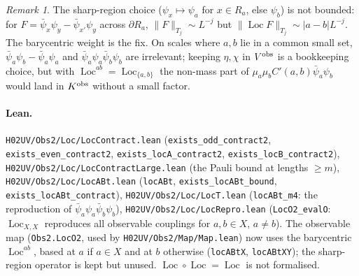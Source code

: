 \documentclass[11pt]{amsart}
\theoremstyle{definition}
\theoremstyle{remark}
\newtheorem{remark}[theorem]{Remark}
\numberwithin{equation}{section}
\newcommand{\Loc}{\operatorname{Loc}}
\begin{document}
\begin{remark}
The sharp-region choice ($\psi_x\mapsto\psi_a$ for $x\in R_a$, else $\psi_b$) is not bounded: for
$F=\bar\psi_x\psi_y-\bar\psi_{x'}\psi_y$ across $\partial R_a$, $\|F\|_{T_j}\sim L^{-j}$ but
$\|\Loc F\|_{T_j}\sim|a-b|L^{-j}$. The barycentric weight is the fix. On scales where $a,b$ lie in a
common small set, $\bar\psi_a\psi_b-\bar\psi_a\psi_a$ and $\bar\psi_a\psi_a\bar\psi_b\psi_b$ are irrelevant;
keeping $\eta,\chi$ in $V^{\rm obs}$ is a bookkeeping choice, but with $\Loc^{ab}=\Loc_{\{a,b\}}$ the
non-mass part of $\mu_a\mu_bC'(a,b)\bar\psi_a\psi_b$ would land in $K^{\rm obs}$ without a small factor.
\end{remark}
\paragraph{Lean.} \texttt{H02UV/Obs2/Loc/LocContract.lean} (\texttt{exists\_odd\_contract2},
\texttt{exists\_even\_contract2}, \texttt{exists\_locA\_contract2}, \texttt{exists\_locB\_contract2}),
\texttt{H02UV/Obs2/Loc/LocContractLarge.lean} (the Pauli bound at lengths $\ge m$), \texttt{H02UV/Obs2/Loc/LocABt.lean}
(\texttt{locABt}, \texttt{exists\_locABt\_bound}, \texttt{exists\_locABt\_contract}),
\texttt{H02UV/Obs2/Loc/LocT.lean} (\texttt{locABt\_m4}: the reproduction of $\bar\psi_a\psi_a\bar\psi_b\psi_b$),
\texttt{H02UV/Obs2/Loc/LocRepro.lean} (\texttt{LocO2\_evalO}: $\Loc_{X,X}$ reproduces all observable couplings
for $a,b\in X$, $a\ne b$). The observable map (\texttt{Obs2.LocO2}, used by \texttt{H02UV/Obs2/Map/Map.lean})
now uses the barycentric $\Loc^{ab}$, based at $a$ if $a\in X$ and at $b$ otherwise
(\texttt{locABtX}, \texttt{locABtXY}); the sharp-region operator is kept but unused.
$\Loc\circ\Loc=\Loc$ is not formalised.
\end{document}
